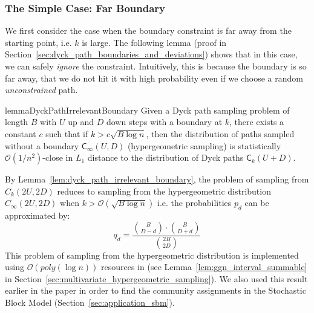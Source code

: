 \subsubsection{The Simple Case: Far Boundary}%
\label{sec:the_simple_case}
We first consider the case when the boundary constraint is far away from the starting point, i.e. $k$ is large.
The following lemma (proof in Section~\ref{sec:dyck_path_boundaries_and_deviations}) shows that in this case,
we can safely \emph{ignore} the constraint.  Intuitively, this is because the boundary is so far away,
that we do not hit it with high probability even if we choose a random \emph{unconstrained} path.
\begin{restatable}{lemma}{DyckPathIrrelevantBoundary}
\label{lem:dyck_path_irrelevant_boundary}
Given a Dyck path sampling problem of length $B$ with $U$ up and $D$ down steps with a boundary at $k$,
there exists a constant $c$ such that if $k > c \sqrt{B\log n}$, then the distribution of paths sampled without a boundary $\mathsf C_{\infty}(U,D)$
(hypergeometric sampling) is statistically $\mathcal O(1/n^2)$-close in $L_1$ distance to the distribution of Dyck paths $\mathsf C_k(U+D)$.
\end{restatable}
By Lemma~\ref{lem:dyck_path_irrelevant_boundary}, the problem of sampling from $C_k(2U,2D)$
reduces to sampling from the hypergeometric distribution $C_{\infty}(2U,2D)$ when $k>\mathcal{O}(\sqrt{B\log n})$
i.e. the probabilities $p_d$ can be approximated by:
\[
q_d = \frac{{{B}\choose{D-d}}\cdot{{B}\choose{D+d}}}{{{2B}\choose{2D}}}
\]
This problem of sampling from the hypergeometric distribution is implemented using $\mathcal O(poly(\log n))$ resources in \cite{huge}
(see Lemma~\ref{lem:ggn_interval_summable} in Section~\ref{sec:multivariate_hypergeometric_sampling}).
We also used this result earlier in the paper in order to find the community assignments in the Stochastic Block Model
(Section~\ref{sec:application_sbm}).

